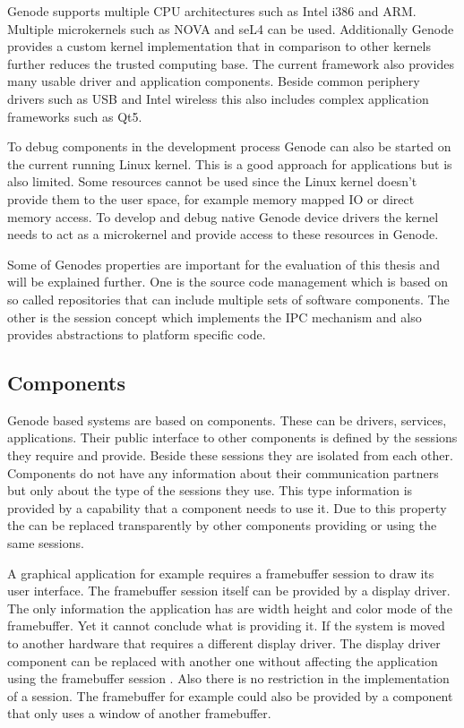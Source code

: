 \documentclass[
a4paper,
12pt,
notitlepage,
parskip=half,
DIV=11,
]{scrbook}
\begin{document}
		Genode supports multiple CPU architectures such as Intel i386 and ARM.
		Multiple microkernels such as NOVA and seL4 can be used.
		Additionally Genode provides a custom kernel implementation that in comparison to other kernels further reduces the trusted computing base.
		The current framework also provides many usable driver and application components.
		Beside common periphery drivers such as USB and Intel wireless this also includes complex application frameworks such as Qt5. \citep{genode}
		
		To debug components in the development process Genode can also be started on the current running Linux kernel.
		This is a good approach for applications but is also limited.
		Some resources cannot be used since the Linux kernel doesn't provide them to the user space, for example memory mapped IO or direct memory access.
		To develop and debug native Genode device drivers the kernel needs to act as a microkernel and provide access to these resources in Genode.
		
		Some of Genodes properties are important for the evaluation of this thesis and will be explained further.
		One is the source code management which is based on so called repositories that can include multiple sets of software components.
		The other is the session concept which implements the IPC mechanism and also provides abstractions to platform specific code.
		
		\subsection{Components}
		
		Genode based systems are based on components.
		These can be drivers, services, applications.
		Their public interface to other components is defined by the sessions they require and provide.
		Beside these sessions they are isolated from each other.
		Components do not have any information about their communication partners but only about the type of the sessions they use.
		This type information is provided by a capability that a component needs to use it.
		Due to this property the can be replaced transparently by other components providing or using the same sessions. \citep{genode}
		
		A graphical application for example requires a framebuffer session to draw its user interface.
		The framebuffer session itself can be provided by a display driver.
		The only information the application has are width height and color mode of the framebuffer.
		Yet it cannot conclude what is providing it.
		If the system is moved to another hardware that requires a different display driver.
		The display driver component can be replaced with another one without affecting the application using the framebuffer session \citep{genode}.
		Also there is no restriction in the implementation of a session.
		The framebuffer for example could also be provided by a component that only uses a window of another framebuffer.
		
\end{document}
